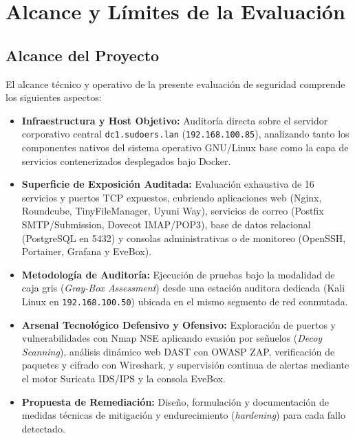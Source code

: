 \section{Alcance y Límites de la Evaluación}

\subsection{Alcance del Proyecto}

El alcance técnico y operativo de la presente evaluación de seguridad comprende los siguientes aspectos:

\begin{itemize}
  \item \textbf{Infraestructura y Host Objetivo:} Auditoría directa sobre el servidor corporativo central \texttt{dc1.sudoers.lan} (\texttt{192.168.100.85}), analizando tanto los componentes nativos del sistema operativo GNU/Linux base como la capa de servicios contenerizados desplegados bajo Docker.
  \item \textbf{Superficie de Exposición Auditada:} Evaluación exhaustiva de 16 servicios y puertos TCP expuestos, cubriendo aplicaciones web (Nginx, Roundcube, TinyFileManager, Uyuni Way), servicios de correo (Postfix SMTP/Submission, Dovecot IMAP/POP3), base de datos relacional (PostgreSQL en 5432) y consolas administrativas o de monitoreo (OpenSSH, Portainer, Grafana y EveBox).
  \item \textbf{Metodología de Auditoría:} Ejecución de pruebas bajo la modalidad de caja gris (\textit{Gray-Box Assessment}) desde una estación auditora dedicada (Kali Linux en \texttt{192.168.100.50}) ubicada en el mismo segmento de red conmutada.
  \item \textbf{Arsenal Tecnológico Defensivo y Ofensivo:} Exploración de puertos y vulnerabilidades con Nmap NSE aplicando evasión por señuelos (\textit{Decoy Scanning}), análisis dinámico web DAST con OWASP ZAP, verificación de paquetes y cifrado con Wireshark, y supervisión continua de alertas mediante el motor Suricata IDS/IPS y la consola EveBox.
  \item \textbf{Propuesta de Remediación:} Diseño, formulación y documentación de medidas técnicas de mitigación y endurecimiento (\textit{hardening}) para cada fallo detectado.
\end{itemize}

